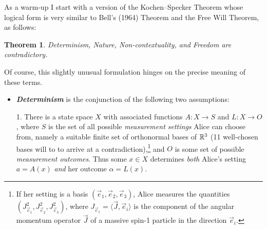 \documentclass[11pt,a4paper]{article}
\numberwithin{equation}{section}
\newcommand{\hi}[1]{\emph{\textbf{#1}}}
\newcommand{\raw}{\rightarrow}
\newcommand{\la}{\langle} \newcommand{\ra}{\rangle}
\newcommand{\al}{\alpha} \newcommand{\bt}{L\beta}
\newtheorem{theorem}[definition]{Theorem}
\begin{document}
As a warm-up I start with a version of the Kochen--Specker Theorem whose logical form is very similar to Bell's (1964) Theorem and the Free Will Theorem, as follows:
    \begin{theorem}\label{KSthm}
 Determinism, Nature, Non-contextuality, and Freedom  are contradictory.
\end{theorem}
Of course, this slightly unusual formulation hinges on the precise meaning of these terms. 
\begin{itemize}
\item 
{}\hi{Determinism} is the conjunction of the following two assumptions:

1. There is a state space $X$  with associated functions $A: X\raw S$ and $L:X\raw O$,
where $S$ is  the set of all  possible \emph{measurement settings} Alice can choose from, namely 
 a suitable finite set of orthonormal bases of ${\mathbb R}^3$ (11 well-chosen bases will to to arrive at a contradiction),\footnote{If her setting is a basis 
 $(\vec{e}_1,\vec{e}_2,\vec{e}_3)$, Alice measures the quantities $(J_{\vec{e}_1}^2, J_{\vec{e}_2}^2, J_{\vec{e}_3}^2)$, where
 $J_{\vec{e}_1}=\la\vec{J},\vec{e}_i\ra$ is the component of the angular momentum operator $\vec{J}$ of a massive spin-1 particle in the direction $\vec{e}_i$.} and  $O$ is some set of possible  \emph{measurement outcomes}. Thus some $x\in X$ determines \emph{both} Alice's setting $a=A(x)$ \emph{and} her 
 outcome  $\al=L(x)$. 


\end{itemize}
\end{document}
